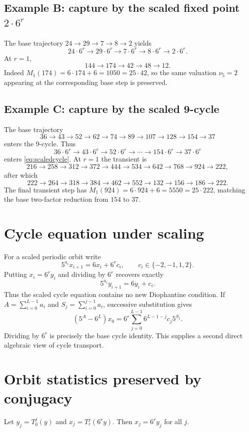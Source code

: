 \documentclass[11pt]{article}
\begin{document}
\subsection*{Example B: capture by the scaled fixed point $2\cdot6^r$}
The base trajectory $24\to29\to7\to8\to2$ yields
\[
24\cdot6^r\to29\cdot6^r\to7\cdot6^r\to8\cdot6^r\to2\cdot6^r.
\]
At $r=1$,
\[
144\to174\to42\to48\to12.
\]
Indeed $M_1(174)=6\cdot174+6=1050=25\cdot42$, so the same valuation $\nu_5=2$ appearing at the corresponding base step is preserved.

\subsection*{Example C: capture by the scaled 9-cycle}
The base trajectory
\[
36\to43\to52\to62\to74\to89\to107\to128\to154\to37
\]
enters the 9-cycle. Thus
\[
36\cdot6^r\to43\cdot6^r\to52\cdot6^r\to\cdots\to154\cdot6^r\to37\cdot6^r
\]
enters \eqref{eq:scaledcycle}. At $r=1$ the transient is
\[
216\to258\to312\to372\to444\to534\to642\to768\to924\to222,
\]
after which
\[
222\to264\to318\to384\to462\to552\to132\to156\to186\to222.
\]
The final transient step has $M_1(924)=6\cdot924+6=5550=25\cdot222$, matching the base two-factor reduction from $154$ to $37$.

\section{Cycle equation under scaling}
For a scaled periodic orbit write
\begin{equation}5^{a_i}x_{i+1}=6x_i+6^r c_i,\qquad c_i\in\{-2,-1,1,2\}.\label{eq:scaledcycleeq}\end{equation}
Putting $x_i=6^r y_i$ and dividing by $6^r$ recovers exactly
\[
5^{a_i}y_{i+1}=6y_i+c_i.
\]
Thus the scaled cycle equation contains no new Diophantine condition. If $A=\sum_{i=0}^{L-1}a_i$ and $S_j=\sum_{i=0}^{j-1}a_i$, successive substitution gives
\begin{equation}
(5^A-6^L)x_0=6^r\sum_{j=0}^{L-1}6^{L-1-j}c_j5^{S_j}.\label{eq:scaledidentity}
\end{equation}
Dividing by $6^r$ is precisely the base cycle identity. This supplies a second direct algebraic view of cycle transport.

\section{Orbit statistics preserved by conjugacy}
Let $y_j=T_0^j(y)$ and $x_j=T_r^j(6^r y)$. Then $x_j=6^r y_j$ for all $j$.
\end{document}
